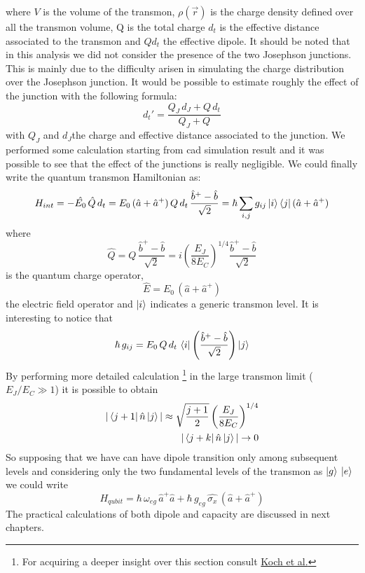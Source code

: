 where $V$ is the volume of the transmon, $\rho(\vec{r})$ is the charge density defined over all the transmon volume, Q is the total charge $d_{t}$ is the effective distance associated to the transmon and $Qd_{t}$ the effective dipole.
It should be noted that in this analysis we did not consider the presence of the two Josephson junctions. This is mainly due to the difficulty arisen in simulating the charge distribution over the Josephson junction. It would be possible to estimate roughly the effect of the junction with the following formula:
\begin{equation}
    d_t\prime = \frac{Q_J\,d_J+Q\,d_t}{Q_J + Q}
\end{equation}
with $Q_J$  and $d_J$the charge and effective distance associated to the junction. We performed some calculation starting from cad simulation result and it was possible to see that the effect of the junctions is really negligible.
We could finally write the quantum transmon Hamiltonian as:
\begin{equation}
    H_{int} =-\hat{E_0} \, \hat{Q} \, d_t = E_0\,(\hat{a} + \hat{a}^+)\, Q\, d_t\,\frac{\hat{b}^+- \hat{b}}{\sqrt{2}} = \hbar \sum_{i,j} g_{ij} \ket{i}\bra{j}(\hat{a} + \hat{a}^+)
\end{equation}
where $$\hat{Q} = Q\,\frac{\hat{b}^+- \hat{b}}{\sqrt{2}} = i\left(\frac{E_J}{8E_C}\right)^{1/4}\frac{\hat{b}^+- \hat{b}}{\sqrt{2}}$$ is the quantum charge operator, $$\hat{E}=E_0\,(\hat{a} + \hat{a}^+)$$ the electric field operator and $\ket{i}$ indicates a generic transmon level.
It is interesting to notice that
\begin{equation}
    \begin{split}
        \hbar\,g_{ij} = E_0\,Q\,d_t\,\bra{i}\left(\frac{\hat{b}^+- \hat{b}}{\sqrt{2}}\right)\ket{j}
    \end{split}
\end{equation}
By performing more detailed calculation \footnote{For acquiring a deeper insight over this section consult \hyperlink{https://arxiv.org/pdf/cond-mat/0703002.pdf}{Koch et al.}} in the large transmon limit ($ E_J/E_C \gg 1$) it is possible to obtain
\begin{equation}
    \begin{split}
        |\bra{j+1}\hat{n}\ket{j}| \approx \sqrt{\frac{j+1}{2}}\left(\frac{E_J}{8E_C}\right)^{1/4}\\
        |\bra{j+k}\hat{n}\ket{j}| \rightarrow 0  
    \end{split}
\end{equation}
So supposing that we have can have dipole transition only among subsequent levels and considering only the two fundamental levels of the transmon as $\ket{g} \: \ket{e}$ we could write
\begin{equation}
    H_{qubit} = \hbar\, \omega_{eg}\, \hat{a}^+\hat{a} + \hbar\, g_{eg}\, \hat{\sigma_x}\, (\hat{a} + \hat{a}^+)
\end{equation}
The practical calculations of both dipole and capacity are discussed in next chapters.
